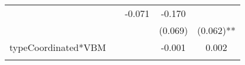 \documentclass[12pt,twoside]{reedthesis}
\begin{document}
\begin{longtable}[]{@{}lcccc@{}}
\begin{minipage}[t]{0.12\columnwidth}
  \strut
  \end{minipage} & \begin{minipage}[t]{0.14\columnwidth}\centering\strut
  \strut
  \end{minipage} & \begin{minipage}[t]{0.14\columnwidth}\centering\strut
  -0.071\strut
  \end{minipage} & \begin{minipage}[t]{0.14\columnwidth}\centering\strut
  -0.170\strut
  \end{minipage}\tabularnewline
  \begin{minipage}[t]{0.26\columnwidth}\raggedright\strut
  \strut
  \end{minipage} & \begin{minipage}[t]{0.12\columnwidth}\centering\strut
  \strut
  \end{minipage} & \begin{minipage}[t]{0.14\columnwidth}\centering\strut
  \strut
  \end{minipage} & \begin{minipage}[t]{0.14\columnwidth}\centering\strut
  (0.069)\strut
  \end{minipage} & \begin{minipage}[t]{0.14\columnwidth}\centering\strut
  (0.062)**\strut
  \end{minipage}\tabularnewline
  \begin{minipage}[t]{0.26\columnwidth}\raggedright\strut
  typeCoordinated*VBM\strut
  \end{minipage} & \begin{minipage}[t]{0.12\columnwidth}\centering\strut
  \strut
  \end{minipage} & \begin{minipage}[t]{0.14\columnwidth}\centering\strut
  \strut
  \end{minipage} & \begin{minipage}[t]{0.14\columnwidth}\centering\strut
  -0.001\strut
  \end{minipage} & \begin{minipage}[t]{0.14\columnwidth}\centering\strut
  0.002\strut
  \end{minipage}\tabularnewline
  \begin{minipage}[t]{0.26\columnwidth}\raggedright\strut
  \strut
  \end{minipage} & \begin{minipage}[t]{0.12\columnwidth}\centering\strut
  \strut
  \end{minipage} & \begin{minipage}[t]{0.14\columnwidth}\centering\strut

\end{minipage}
\end{longtable}
\end{document}
